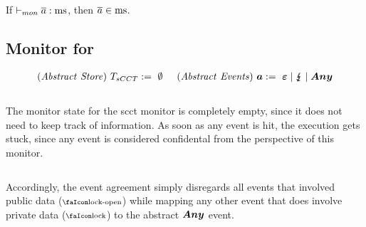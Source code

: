 \documentclass[utf8,acmsmall,review,screen,dvipsnames]{acmart}
\begin{document}
\begin{lemma}\label{lem:mon:msafe}
  If $\vdash_{mon}{\overline{a}}:{\operatorname{ms}}$, then $\overline{a}\in\operatorname{ms}$.\Coqed
\end{lemma}

\subsection{Monitor for }
\begin{gather*}
  \begin{aligned}
    \mathit{(Abstract\ Store)}~T_{sCCT}{}&:=\ \emptyset \hspace{0.5cm}
    \mathit{(Abstract\ Events)}~\bm{a}:=\ \bm{\varepsilon} \mid \lightning{\kern-5.5pt}\lightning \mid \bm{Any} \\
  \end{aligned}
\end{gather*}
\begin{center}
  $\;$\\
\end{center}
The monitor state for the \gls{scct} monitor is completely empty, since it does not need to keep track of information.
As soon as any event is hit, the execution gets stuck, since any event is considered confidental from the perspective of this monitor.
\begin{center}
  $\;$\\
\end{center}
Accordingly, the event agreement simply disregards all events that involved public data ($\unlock$) while mapping any other event that does involve private data ($\lock$) to the abstract $\bm{Any}$ event.
\end{document}
